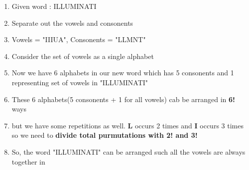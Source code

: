 \documentclass[14pt, letterpaper]{article}
\begin{document}
\begin{enumerate}
  \item Given word : ILLUMINATI
  \item Separate out the vowels and consonents
  \item Vowels = "IIIUA", Consonents = "LLMNT"
  \item Consider the set of vowels as a single alphabet
  \item Now we have 6 alphabets in our new word which has 5 consonents and 1 representing set of vowels in "ILLUMINATI"
  \item These 6 alphabets(5 consonents + 1 for all vowels) cab be arranged in \textbf{6!} ways
  \item but we have some repetitions as well. \textbf{L} occurs 2 times and \textbf{I} occurs 3 times so we need to \textbf{divide total purmutations with 2! and 3!}
  \item So, the word "ILLUMINATI" can be arranged such all the vowels are always together in 
\end{enumerate}
\end{document}
